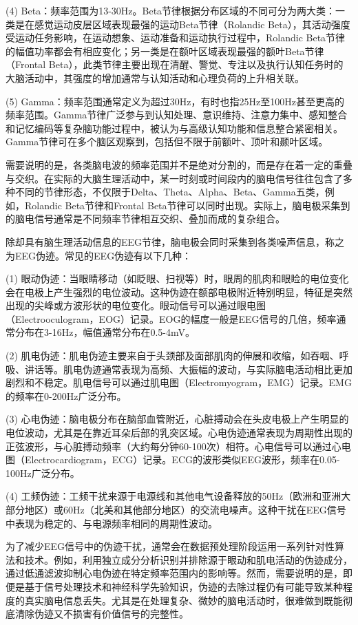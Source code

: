 (4) Beta：频率范围为13-30Hz。Beta节律根据分布区域的不同可分为两大类：一类是在感觉运动皮层区域表现最强的运动Beta节律（Rolandic Beta），其活动强度受运动任务影响，在运动想象、运动准备和运动执行过程中，Rolandic Beta节律的幅值功率都会有相应变化；另一类是在额叶区域表现最强的额叶Beta节律（Frontal Beta），此类节律主要出现在清醒、警觉、专注以及执行认知任务时的大脑活动中，其强度的增加通常与认知活动和心理负荷的上升相关联。

(5) Gamma：频率范围通常定义为超过30Hz，有时也指25Hz至100Hz甚至更高的频率范围。Gamma节律广泛参与到认知处理、意识维持、注意力集中、感知整合和记忆编码等复杂脑功能过程中，被认为与高级认知功能和信息整合紧密相关。Gamma节律可在多个脑区观察到，包括但不限于前额叶、顶叶和颞叶区域。

需要说明的是，各类脑电波的频率范围并不是绝对分割的，而是存在着一定的重叠与交织。在实际的大脑生理活动中，某一时刻或时间段内的脑电信号往往包含了多种不同的节律形态，不仅限于Delta、Theta、Alpha、Beta、Gamma五类，例如，Rolandic Beta节律和Frontal Beta节律可以同时出现。实际上，脑电极采集到的脑电信号通常是不同频率节律相互交织、叠加而成的复杂组合。

除却具有脑生理活动信息的EEG节律，脑电极会同时采集到各类噪声信息，称之为EEG伪迹。常见的EEG伪迹有以下几种：

(1) 眼动伪迹：当眼睛移动（如眨眼、扫视等）时，眼周的肌肉和眼睑的电位变化会在电极上产生强烈的电位波动。这种伪迹在额部电极附近特别明显，特征是突然出现的尖峰或方波形状的电位变化。眼动信号可以通过眼电图（Electrooculogram，EOG）记录。EOG的幅度一般是EEG信号的几倍，频率通常分布在3-16Hz，幅值通常分布在0.5-4mV。

(2) 肌电伪迹：肌电伪迹主要来自于头颈部及面部肌肉的伸展和收缩，如吞咽、呼吸、讲话等。肌电伪迹通常表现为高频、大振幅的波动，与实际脑电活动相比更加剧烈和不稳定。肌电信号可以通过肌电图（Electromyogram，EMG）记录。EMG的频率在0-200Hz广泛分布。

(3) 心电伪迹：脑电极分布在脑部血管附近，心脏搏动会在头皮电极上产生明显的电位波动，尤其是在靠近耳朵后部的乳突区域。心电伪迹通常表现为周期性出现的正弦波形，与心脏搏动频率（大约每分钟60-100次）相符。心电信号可以通过心电图（Electrocardiogram，ECG）记录。ECG的波形类似EEG波形，频率在0.05-100Hz广泛分布。

(4) 工频伪迹：工频干扰来源于电源线和其他电气设备释放的50Hz（欧洲和亚洲大部分地区）或60Hz（北美和其他部分地区）的交流电噪声。这种干扰在EEG信号中表现为稳定的、与电源频率相同的周期性波动。

为了减少EEG信号中的伪迹干扰，通常会在数据预处理阶段运用一系列针对性算法和技术。例如，利用独立成分分析识别并排除源于眼动和肌电活动的伪迹成分，通过低通滤波抑制心电伪迹在特定频率范围内的影响等。然而，需要说明的是，即便是基于信号处理技术和神经科学先验知识，伪迹的去除过程仍有可能导致某种程度的真实脑电信息丢失。尤其是在处理复杂、微妙的脑电活动时，很难做到既能彻底清除伪迹又不损害有价值信号的完整性。

